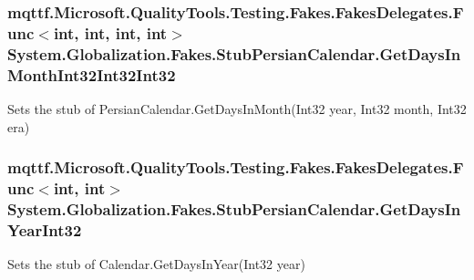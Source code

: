 \hypertarget{class_system_1_1_globalization_1_1_fakes_1_1_stub_persian_calendar_ac973a886a099bb202226dcd302e5abe9}{
\subsubsection[{Get\-Days\-In\-Month\-Int32\-Int32\-Int32}]{\setlength{\rightskip}{0pt plus 5cm}mqttf.\-Microsoft.\-Quality\-Tools.\-Testing.\-Fakes.\-Fakes\-Delegates.\-Func$<$int, int, int, int$>$ System.\-Globalization.\-Fakes.\-Stub\-Persian\-Calendar.\-Get\-Days\-In\-Month\-Int32\-Int32\-Int32}}\label{class_system_1_1_globalization_1_1_fakes_1_1_stub_persian_calendar_ac973a886a099bb202226dcd302e5abe9}


Sets the stub of Persian\-Calendar.\-Get\-Days\-In\-Month(\-Int32 year, Int32 month, Int32 era)

\hypertarget{class_system_1_1_globalization_1_1_fakes_1_1_stub_persian_calendar_a2c78bbb56daabe67521be4dee740fe6a}{
\subsubsection[{Get\-Days\-In\-Year\-Int32}]{\setlength{\rightskip}{0pt plus 5cm}mqttf.\-Microsoft.\-Quality\-Tools.\-Testing.\-Fakes.\-Fakes\-Delegates.\-Func$<$int, int$>$ System.\-Globalization.\-Fakes.\-Stub\-Persian\-Calendar.\-Get\-Days\-In\-Year\-Int32}}\label{class_system_1_1_globalization_1_1_fakes_1_1_stub_persian_calendar_a2c78bbb56daabe67521be4dee740fe6a}


Sets the stub of Calendar.\-Get\-Days\-In\-Year(\-Int32 year)

